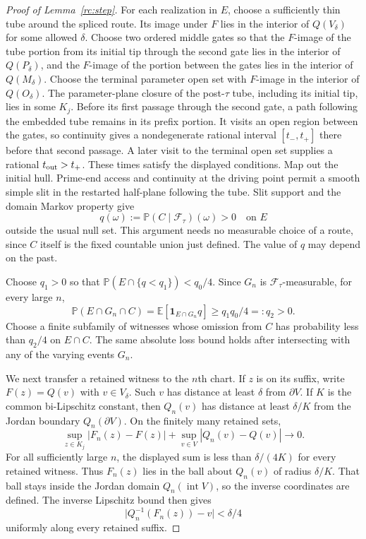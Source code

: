 \documentclass[11pt]{article}
\theoremstyle{definition}
\theoremstyle{remark}
\numberwithin{equation}{section}
\begin{document}
\begin{proof}[Proof of Lemma~\ref{rc:step}]
For each realization in $E$, choose a sufficiently thin tube around
the spliced route. Its image under $F$ lies in the interior of
$Q(V_\delta)$ for some allowed $\delta$. Choose two ordered middle
gates so that the $F$-image of the tube portion from its initial tip
through the second gate lies in the interior of $Q(P_\delta)$, and
the $F$-image of the portion between the gates lies in the interior
of $Q(M_\delta)$. Choose the terminal parameter open set with
$F$-image in the interior of $Q(O_\delta)$. The parameter-plane closure
of the post-$\tau$ tube, including its initial tip, lies in some $K_j$.
Before its first passage through the second gate, a path following the
embedded tube remains in its prefix portion. It visits an open region
between the gates, so continuity gives a nondegenerate rational interval
$[t_-,t_+]$ there before that second passage. A later visit to the
terminal open set supplies a rational $t_{\rm out}>t_+$. These times
satisfy the displayed conditions. Map out the initial hull. Prime-end
access and continuity at the driving point permit a smooth simple slit in the
restarted half-plane following the tube. Slit support and the domain
Markov property give
\[
 q(\omega):=\mathbb P(C\mid\mathcal F_\tau)(\omega)>0
 \quad\text{on }E
\]
outside the usual null set. This argument needs no measurable choice
of a route, since $C$ itself is the fixed countable union just defined.
The value of $q$ may depend on the past.

Choose $q_1>0$ so that
$\mathbb P(E\cap\{q<q_1\})<q_0/4$. Since $G_n$ is
$\mathcal F_\tau$-measurable, for every large $n$,
\begin{equation}\label{rc:varying-good-events}
 \mathbb P(E\cap G_n\cap C)
 =\mathbb E[\mathbf1_{E\cap G_n}q]
 \ge q_1q_0/4=:q_2>0.
\end{equation}
Choose a finite subfamily of witnesses whose omission from $C$ has
probability less than $q_2/4$ on $E\cap C$. The same absolute loss
bound holds after intersecting with any of the varying events $G_n$.

We next transfer a retained witness to the $n$th chart. If $z$ is on
its suffix, write $F(z)=Q(v)$ with $v\in V_\delta$. Such $v$ has
distance at least $\delta$ from $\partial V$. If $K$ is the common
bi-Lipschitz constant, then $Q_n(v)$ has distance at least $\delta/K$
from the Jordan boundary $Q_n(\partial V)$. On the finitely many
retained sets,
\[
 \sup_{z\in K_j}|F_n(z)-F(z)|
       +\sup_{v\in V}|Q_n(v)-Q(v)|\longrightarrow0.
\]
For all sufficiently large $n$, the displayed sum is less than
$\delta/(4K)$ for every retained witness. Thus $F_n(z)$ lies in the
ball about $Q_n(v)$ of radius $\delta/K$. That ball stays inside
the Jordan domain $Q_n(\operatorname{int}V)$, so the inverse coordinates
are defined. The inverse Lipschitz bound then gives
\[
 \bigl|Q_n^{-1}(F_n(z))-v\bigr|<\delta/4
\]
uniformly along every retained suffix.


\end{proof}
\end{document}

